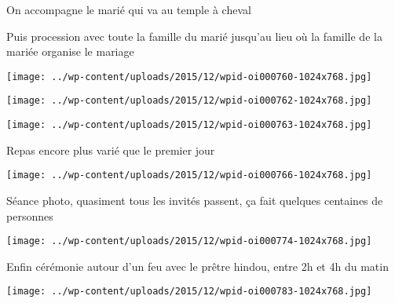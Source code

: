 On accompagne le marié qui va au temple à cheval

Puis procession avec toute la famille du marié jusqu'au lieu où la famille de la mariée organise le mariage 
\begin{center} \texttt{[image: ../wp-content/uploads/2015/12/wpid-oi000760-1024x768.jpg]} \end{center}
\begin{center} \texttt{[image: ../wp-content/uploads/2015/12/wpid-oi000762-1024x768.jpg]} \end{center}
\begin{center} \texttt{[image: ../wp-content/uploads/2015/12/wpid-oi000763-1024x768.jpg]} \end{center}
\pagebreak

Repas encore plus varié que le premier jour 
\begin{center} \texttt{[image: ../wp-content/uploads/2015/12/wpid-oi000766-1024x768.jpg]} \end{center}

Séance photo, quasiment tous les invités passent, ça fait quelques centaines de personnes 
\begin{center} \texttt{[image: ../wp-content/uploads/2015/12/wpid-oi000774-1024x768.jpg]} \end{center}
\pagebreak

Enfin cérémonie autour d'un feu avec le prêtre hindou, entre 2h et 4h du matin 
\begin{center} \texttt{[image: ../wp-content/uploads/2015/12/wpid-oi000783-1024x768.jpg]} \end{center}
